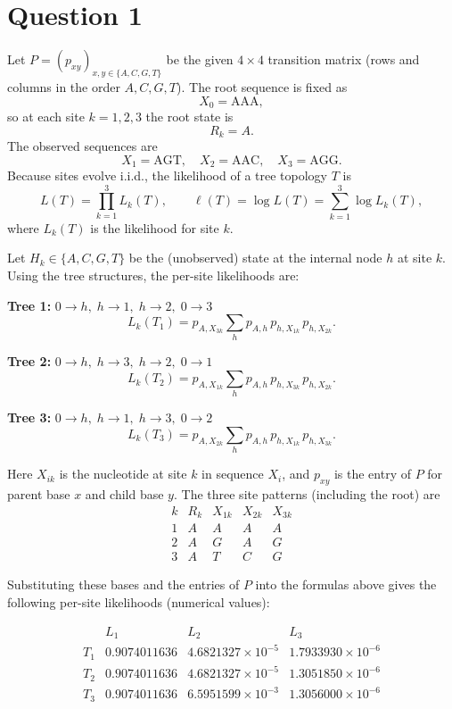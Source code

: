\section*{Question 1}

Let $P=(p_{xy})_{x,y\in\{A,C,G,T\}}$ be the given $4\times4$ transition matrix
(rows and columns in the order $A,C,G,T$).
The root sequence is fixed as
\[
    X_0 = \mathrm{AAA},
\]
so at each site $k=1,2,3$ the root state is
\[
    R_k = A.
\]
The observed sequences are
\[
    X_1 = \mathrm{AGT},\quad
    X_2 = \mathrm{AAC},\quad
    X_3 = \mathrm{AGG}.
\]
Because sites evolve i.i.d., the likelihood of a tree topology $T$ is
\[
    L(T) = \prod_{k=1}^{3} L_k(T),
    \qquad
    \ell(T) = \log L(T) = \sum_{k=1}^{3} \log L_k(T),
\]
where $L_k(T)$ is the likelihood for site $k$.

Let $H_k\in\{A,C,G,T\}$ be the (unobserved) state at the internal node $h$
at site $k$.
Using the tree structures, the per-site likelihoods are:

\medskip\noindent
\textbf{Tree 1:} $0 \to h,\;h\to 1,\;h\to 2,\;0\to 3$
\[
    L_k(T_1)
    = p_{A,X_{3k}}\sum_{h} p_{A,h}\,p_{h,X_{1k}}\,p_{h,X_{2k}}.
\]

\noindent
\textbf{Tree 2:} $0 \to h,\;h\to 3,\;h\to 2,\;0\to 1$
\[
    L_k(T_2)
    = p_{A,X_{1k}}\sum_{h} p_{A,h}\,p_{h,X_{3k}}\,p_{h,X_{2k}}.
\]

\noindent
\textbf{Tree 3:} $0 \to h,\;h\to 1,\;h\to 3,\;0\to 2$
\[
    L_k(T_3)
    = p_{A,X_{2k}}\sum_{h} p_{A,h}\,p_{h,X_{1k}}\,p_{h,X_{3k}}.
\]

\medskip
Here $X_{ik}$ is the nucleotide at site $k$ in sequence $X_i$,
and $p_{xy}$ is the entry of $P$ for parent base $x$ and child base $y$.
The three site patterns (including the root) are
\[
    \begin{array}{c|cccc}
        k & R_k & X_{1k} & X_{2k} & X_{3k} \\ \hline
        1 & A   & A      & A      & A      \\
        2 & A   & G      & A      & G      \\
        3 & A   & T      & C      & G
    \end{array}
\]

Substituting these bases and the entries of $P$ into the formulas above
gives the following per-site likelihoods (numerical values):

\[
    \begin{array}{c|ccc}
            & L_1          & L_2                    & L_3                    \\ \hline
        T_1 & 0.9074011636 & 4.6821327\times10^{-5} & 1.7933930\times10^{-6} \\
        T_2 & 0.9074011636 & 4.6821327\times10^{-5} & 1.3051850\times10^{-6} \\
        T_3 & 0.9074011636 & 6.5951599\times10^{-3} & 1.3056000\times10^{-6}
    \end{array}
\]

